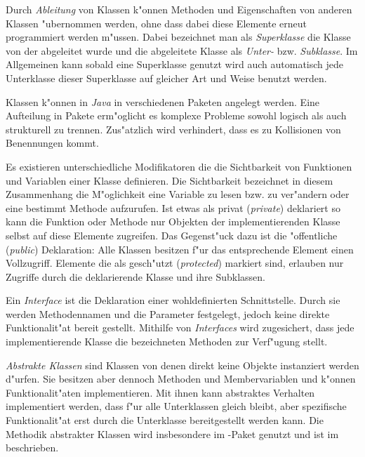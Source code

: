 Durch \emph{Ableitung} von Klassen k"onnen Methoden und Eigenschaften von anderen Klassen "ubernommen werden, ohne dass dabei diese Elemente erneut programmiert werden m"ussen.
Dabei bezeichnet man als \emph{Superklasse} die Klasse von der abgeleitet wurde und die abgeleitete Klasse als \emph{Unter-} bzw. \emph{Subklasse}.
Im Allgemeinen kann sobald eine Superklasse genutzt wird auch automatisch jede Unterklasse dieser Superklasse auf gleicher Art und Weise benutzt werden.

Klassen k"onnen in \emph{Java} in verschiedenen Paketen angelegt werden.
Eine Aufteilung in Pakete erm"oglicht es komplexe Probleme sowohl logisch als auch strukturell zu trennen.
Zus"atzlich wird verhindert, dass es zu Kollisionen von Benennungen kommt.

Es existieren unterschiedliche Modifikatoren die die Sichtbarkeit von Funktionen und Variablen einer Klasse definieren.
Die Sichtbarkeit bezeichnet in diesem Zusammenhang die M"oglichkeit eine Variable zu lesen bzw. zu ver"andern oder eine bestimmt Methode aufzurufen.
Ist etwas als privat (\emph{private}) deklariert so kann die Funktion oder Methode nur Objekten der implementierenden Klasse selbst auf diese Elemente zugreifen.
Das Gegenst"uck dazu ist die "offentliche (\emph{public}) Deklaration: Alle Klassen besitzen f"ur das entsprechende Element einen Vollzugriff.
Elemente die als gesch"utzt (\emph{protected}) markiert sind, erlauben nur Zugriffe durch die deklarierende Klasse und ihre Subklassen.

Ein \emph{Interface} ist die Deklaration einer wohldefinierten Schnittstelle.
Durch sie werden Methodennamen und die Parameter festgelegt, jedoch keine direkte Funktionalit"at bereit gestellt.
Mithilfe von \emph{Interfaces} wird zugesichert, dass jede implementierende Klasse die bezeichneten Methoden zur Verf"ugung stellt.

\emph{Abstrakte Klassen} sind Klassen von denen direkt keine Objekte instanziert werden d"urfen.
Sie besitzen aber dennoch Methoden und Membervariablen und k"onnen Funktionalit"aten implementieren.
Mit ihnen kann abstraktes Verhalten implementiert werden, dass f"ur alle Unterklassen gleich bleibt, aber spezifische Funktionalit"at erst durch die Unterklasse bereitgestellt werden kann.
Die Methodik abstrakter Klassen wird insbesondere im -Paket genutzt und ist im  beschrieben. \cite{Siebler2011}

